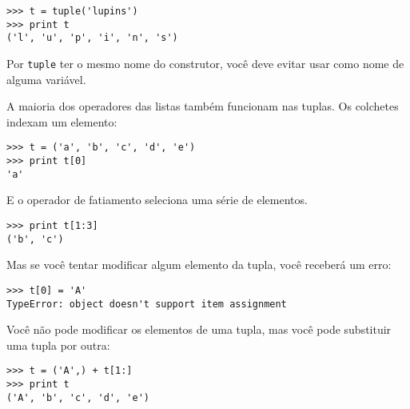 \beforeverb
\begin{verbatim}
>>> t = tuple('lupins')
>>> print t
('l', 'u', 'p', 'i', 'n', 's')
\end{verbatim}
\afterverb
%
Por {\tt tuple} ter o mesmo nome do construtor, você deve evitar usar como
nome de alguma variável.

A maioria dos operadores das listas também funcionam nas tuplas. Os colchetes
indexam um elemento:


\beforeverb
\begin{verbatim}
>>> t = ('a', 'b', 'c', 'd', 'e')
>>> print t[0]
'a'
\end{verbatim}
\afterverb
%
E o operador de fatiamento seleciona uma série de elementos.


\beforeverb
\begin{verbatim}
>>> print t[1:3]
('b', 'c')
\end{verbatim}
\afterverb
%
Mas se você tentar modificar algum elemento da tupla, você receberá um erro:


\beforeverb
\begin{verbatim}
>>> t[0] = 'A'
TypeError: object doesn't support item assignment
\end{verbatim}
\afterverb
%
Você não pode modificar os elementos de uma tupla, mas você pode substituir
uma tupla por outra:

\beforeverb
\begin{verbatim}
>>> t = ('A',) + t[1:]
>>> print t
('A', 'b', 'c', 'd', 'e')
\end{verbatim}
\afterverb
%

